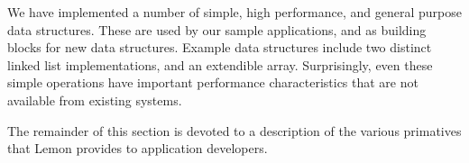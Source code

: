 \documentclass[letterpaper,twocolumn,english]{article}
\newcommand{\yad}{Lemon\xspace}
\begin{document}
We have implemented a number of simple, high performance,
and general purpose data structures.  These are used by our sample
applications, and as building blocks for new data structures.  Example
data structures include two distinct linked list implementations, and
an extendible array.  Surprisingly, even these simple operations have
important performance characteristics that are not available from
existing systems.

The remainder of this section is devoted to a description of the
various primatives that \yad provides to application developers.



%
%
%
%
%
%
%
%
\end{document}
